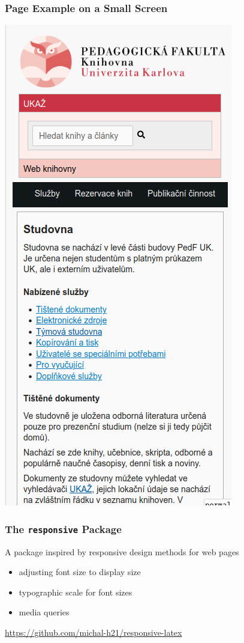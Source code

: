 \begin{frame}
  \frametitle{Page Example on a Small Screen}
  \begin{center}
    \includegraphics[height=.8\textheight]{img/pedf-web-small.png}
  \end{center}
\end{frame}

\begin{frame}
  \frametitle{The \texttt{responsive} Package}

  A package inspired by responsive design methods for web pages
  \begin{itemize}
  \item adjusting font size to display size
  \item typographic scale for font sizes
  \item media queries
  \end{itemize}
  \url{https://github.com/michal-h21/responsive-latex}
\end{frame}

